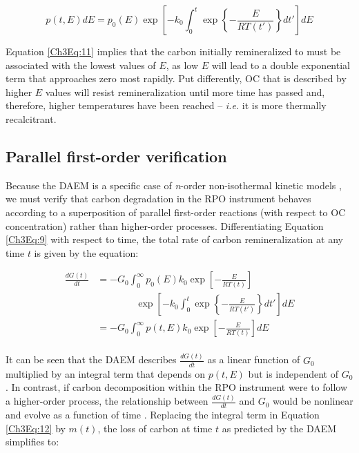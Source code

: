 \begin{equation}\label{Ch3Eq:11}
	p(t,E) dE = p_{0}(E) \exp \left[ - k_{0} \int_{0}^{t} \exp \left\{ - \frac{E}{RT(t')} \right\} dt' \right] dE
\end{equation}

Equation \ref{Ch3Eq:11} implies that the carbon initially remineralized to  must be associated with the lowest values of $E$, as low $E$ will lead to a double exponential term that approaches zero most rapidly. Put differently, OC that is described by higher $E$ values will resist remineralization until more time has passed and, therefore, higher temperatures have been reached -- \textit{i.e.} it is more thermally recalcitrant.

\subsection{Parallel first-order verification}

Because the DAEM is a specific case of \textit{n}-order non-isothermal kinetic models \citep{Braun:1987vf,White:2011iz}, we must verify that carbon degradation in the RPO instrument behaves according to a superposition of parallel first-order reactions (with respect to OC concentration) rather than higher-order processes. Differentiating Equation \ref{Ch3Eq:9} with respect to time, the total rate of carbon remineralization at any time $t$ is given by the equation:

\begin{equation} \label{Ch3Eq:12}
	\begin{split}
	\frac{dG(t)}{dt}  & = - G_{0} \int_{0}^{\infty} p_{0}(E) k_{0} \exp \left[ - \frac{E}{RT(t)} \right] \\
		& \qquad\qquad \exp \left[ - k_{0} \int_{0}^{t} \exp \left\{ - \frac{E}{RT(t')} \right\} dt' \right] dE \\
	& = - G_{0} \int_{0}^{\infty} p(t, E) k_{0} \exp \left[ - \frac{E}{RT(t)} \right] dE \\
	\end{split}
\end{equation}
	
It can be seen that the DAEM describes $\frac{dG(t)}{dt}$ as a linear function of $G_{0}$ multiplied by an integral term that depends on $p(t,E)$ but is independent of $G_{0}$. In contrast, if carbon decomposition within the RPO instrument were to follow a higher-order process, the relationship between $\frac{dG(t)}{dt}$ and $G_{0}$ would be nonlinear and evolve as a function of time \citep[\textit{e.g.}][]{Follett:2014if}. Replacing the integral term in Equation \ref{Ch3Eq:12} by $m(t)$, the loss of carbon at time $t$ as predicted by the DAEM simplifies to:

